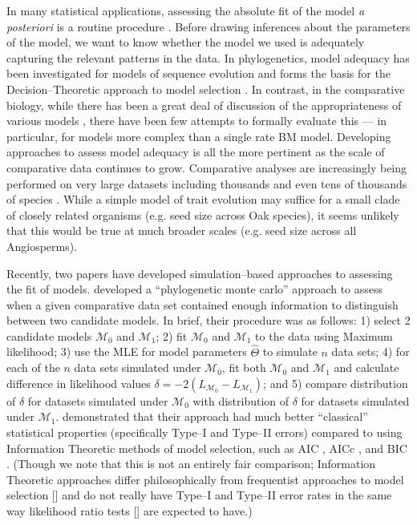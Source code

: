 \documentclass[12pt]{article}
\begin{document}
In many statistical applications, assessing the absolute fit of the model \textit{a posteriori} is a routine procedure \citep{Gelmanbook}. Before drawing inferences about the parameters of the model, we want to know whether the model we used is adequately capturing the relevant patterns in the data. In phylogenetics, model adequacy has been investigated for models of sequence evolution \citep[e.g.][]{GautLewis1995, SullivanSwofford, Goldman, HuelsenbeckBull1996, SandersonKim, Bollback2002, Ripplinger2010, Lewis2013, Brown2013} and forms the basis for the Decision--Theoretic approach to model selection \citep{Minin2003, Abdo2005, SullivanJoyce2005}. In contrast, in the comparative biology, while there has been a great deal of discussion of the appropriateness of various models \citep[e.g.][]{Felsenstein1985, Felsenstein1988, HarveyPagel1991, Pagel1993, Diaz1996, Price1997, GarlandIves2000, Rohlf2006, Freckleton2009, Hansen2012}, there have been few attempts to formally evaluate this --- in particular, for models more complex than a single rate BM model. Developing approaches to assess model adequacy is all the more pertinent as the scale of comparative data continues to grow. Comparative analyses are increasingly being performed on very large datasets including thousands and even tens of thousands of species \citep[e.g.][]{Coopermammal, Jetz2012, Rabosky2013, Cornwell2013, PyronBubrink2013, Zanne2013}. While a simple model of trait evolution may suffice for a small clade of closely related organisms (e.g. seed size across Oak species), it seems unlikely that this would be true at much broader scales (e.g. seed size across all Angiosperms).

Recently, two papers have developed simulation--based approaches to assessing the fit of models. \citet{Boettiger2012} developed a ``phylogenetic monte carlo'' approach to assess when a given comparative data set contained enough information to distinguish between two candidate models. In brief, their procedure was as follows: 1) select 2 candidate models $\mathcal{M}_0$ and $\mathcal{M}_1$; 2) fit $\mathcal{M}_0$ and $\mathcal{M}_1$ to the data using Maximum likelihood; 3) use the MLE for model parameters $\hat{\Theta}$ to simulate $n$ data sets; 4) for each of the $n$ data sets simulated under $\mathcal{M}_0$, fit both $\mathcal{M}_0$ and $\mathcal{M}_1$ and calculate difference in likelihood values $\delta = -2(L_{\mathcal{M}_0} - L_{\mathcal{M}_1})$; and 5) compare distribution of $\delta$ for datasets simulated under $\mathcal{M}_0$ with distribution of $\delta$ for datasets simulated under $\mathcal{M}_1$. \citet{Boettiger2012} demonstrated that their approach had much better ``classical'' statistical properties (specifically Type--I and Type--II errors) compared to using Information Theoretic methods of model selection, such as AIC \citep{Akaike1973}, AICc \citep{AICC}, and BIC \citep{Schwarz1978}. (Though we note that this is not an entirely fair comparison; Information Theoretic approaches differ philosophically from frequentist approaches to model selection [\citealt{BA2004}] and do not really have Type--I and Type--II error rates in the same way likelihood ratio tests [\citealt{Wilks1938}] are expected to have.)
\end{document}
